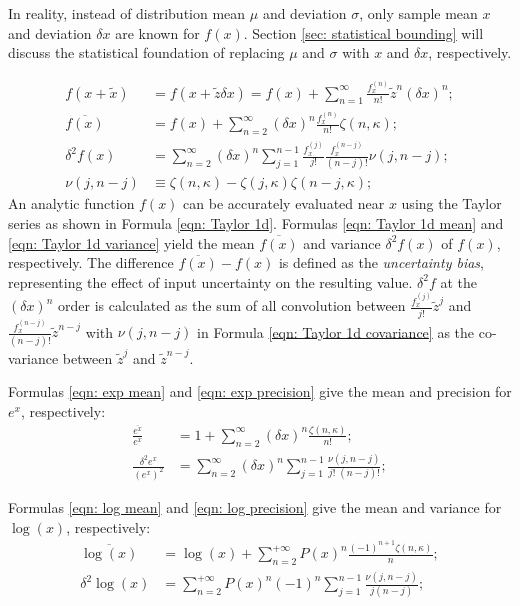 \documentclass[twoside]{article}
\numberwithin{equation}{section}
\begin{document}
In reality, instead of distribution mean $\mu$ and deviation $\sigma$, only sample mean $x$ and deviation $\delta x$ are known for $f(x)$.
Section \ref{sec: statistical bounding} will discuss the statistical foundation of replacing $\mu$ and $\sigma$ with $x$ and $\delta x$, respectively.

\begin{align}
\label{eqn: Taylor 1d}
f(x + \tilde{x}) &= f(x + \tilde{z} \delta x) = f(x) + \sum_{n=1}^{\infty} \frac{f^{(n)}_x}{n!} \tilde{z}^n (\delta x)^n; \\
\label{eqn: Taylor 1d mean}
\overline{f(x)} &= f(x) + \sum_{n=2}^{\infty}(\delta x)^n \frac{f^{(n)}_x}{n!} \zeta(n, \kappa); \\
\label{eqn: Taylor 1d variance}
\delta^2 f(x) &= \sum_{n=2}^{\infty} (\delta x)^n \sum_{j=1}^{n-1} \frac{f^{(j)}_x}{j!} \frac{f^{(n-j)}_x}{(n-j)!} \nu(j, n - j); \\
\label{eqn: Taylor 1d covariance}
\nu(j, n - j) &\equiv \zeta(n, \kappa) - \zeta(j, \kappa) \zeta(n-j, \kappa); 
\end{align}
An analytic function $f(x)$ can be accurately evaluated near $x$ using the Taylor series as shown in Formula \eqref{eqn: Taylor 1d}.
Formulas \eqref{eqn: Taylor 1d mean} and \eqref{eqn: Taylor 1d variance} yield the mean $\overline{f(x)}$ and variance $\delta^2 f(x)$ of $f(x)$, respectively.
The difference $\overline{f(x)} - f(x)$ is defined as the \emph{uncertainty bias}, representing the effect of input uncertainty on the resulting value.
$\delta^2 f$ at the $(\delta x)^n$ order is calculated as the sum of all convolution between $\frac{f^{(j)}_x}{j!} \tilde{z}^j$ and $\frac{f^{(n - j)}_x}{(n - j)!} \tilde{z}^{n -j}$ with $\nu(j, n -j)$ in Formula \eqref{eqn: Taylor 1d covariance} as the co-variance between $\tilde{z}^j$ and $\tilde{z}^{n -j}$.


Formulas \eqref{eqn: exp mean} and \eqref{eqn: exp precision} give the mean and precision for $e^x$, respectively:
\begin{align}
\label{eqn: exp mean}
\frac{\overline{e^x}}{e^x}  &= 1 + \sum_{n=2}^{\infty} (\delta x)^n \frac{\zeta(n, \kappa)}{n!}; \\
\label{eqn: exp precision}
\frac{\delta^2 e^x}{(e^x)^2} &= \sum_{n=2}^{\infty} (\delta x)^n \sum_{j=1}^{n-1} \frac{\nu(j, n -j)}{j!\;(n - j)!};
\end{align}

Formulas \eqref{eqn: log mean} and \eqref{eqn: log precision} give the mean and variance for $\log(x)$, respectively:
\begin{align}
\label{eqn: log mean}
\overline{\log(x)}  &= \log(x) + \sum_{n=2}^{+\infty} P(x)^{n} \frac{(-1)^{n+1} \zeta(n, \kappa)}{n}; \\
\label{eqn: log precision}
\delta^2 \log(x) &= \sum_{n=2}^{+\infty} P(x)^{n} (-1)^n \sum_{j=1}^{n-1} \frac{\nu(j, n -j)}{j (n-j)};
\end{align}
\end{document}
